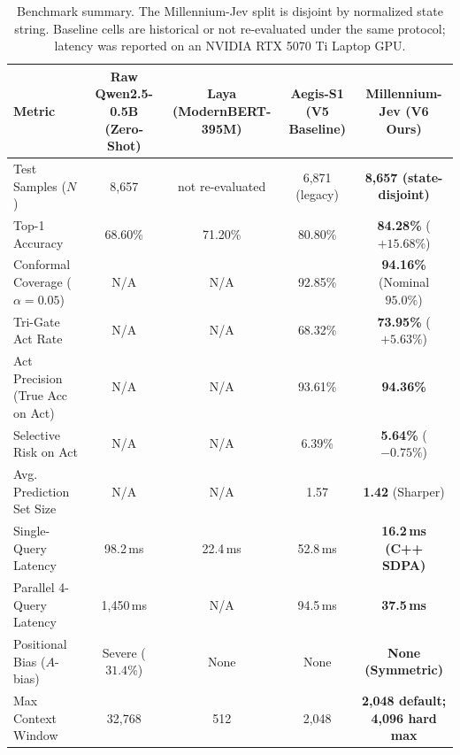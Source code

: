 \documentclass[11pt,a4paper]{article}
\begin{document}
\begin{table}[t]
\centering
\small
\begin{tabular}{lcccc}
\toprule
\textbf{Metric} & \textbf{Raw Qwen2.5-0.5B (Zero-Shot)} & \textbf{Laya (ModernBERT-395M)} & \textbf{Aegis-S1 (V5 Baseline)} & \textbf{Millennium-Jev (V6 Ours)} \\
\midrule
Test Samples ($N$) & 8,657 & \multicolumn{1}{c}{not re-evaluated} & 6,871 (legacy) & \textbf{8,657 (state-disjoint)} \\
Top-1 Accuracy & 68.60\% & 71.20\% & 80.80\% & \textbf{84.28\%} ($+15.68\%$) \\
Conformal Coverage ($\alpha=0.05$) & N/A & N/A & 92.85\% & \textbf{94.16\%} (Nominal $95.0\%$) \\
Tri-Gate Act Rate & N/A & N/A & 68.32\% & \textbf{73.95\%} ($+5.63\%$) \\
Act Precision (True Acc on Act) & N/A & N/A & 93.61\% & \textbf{94.36\%} \\
Selective Risk on Act & N/A & N/A & 6.39\% & \textbf{5.64\%} ($-0.75\%$) \\
Avg. Prediction Set Size & N/A & N/A & 1.57 & \textbf{1.42} (Sharper) \\
Single-Query Latency & 98.2\,ms & 22.4\,ms & 52.8\,ms & \textbf{16.2\,ms (C++ SDPA)} \\
Parallel 4-Query Latency & 1,450\,ms & N/A & 94.5\,ms & \textbf{37.5\,ms} \\
Positional Bias ($A$-bias) & Severe ($31.4\%$) & None & None & \textbf{None (Symmetric)} \\
Max Context Window & 32,768 & 512 & 2,048 & \textbf{2,048 default; 4,096 hard max} \\
\bottomrule
\end{tabular}
\caption{Benchmark summary. The Millennium-Jev split is disjoint by normalized state string. Baseline cells are historical or not re-evaluated under the same protocol; latency was reported on an NVIDIA RTX 5070 Ti Laptop GPU.}
\label{tab:main_results}
\end{table}
\end{document}
